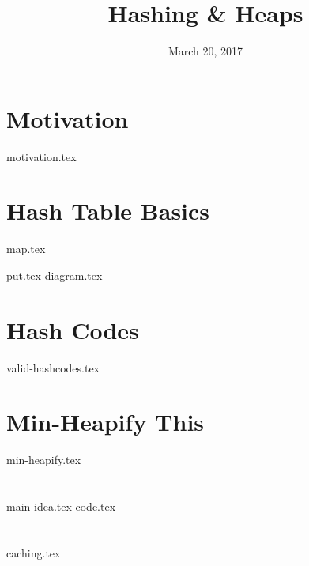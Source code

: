 \documentclass{exam}
\title{Hashing \& Heaps}
\date{March 20, 2017}
\begin{document}
\maketitle

\section{Motivation}
\begin{questions}
{motivation.tex}
\end{questions}

\clearpage

\section{Hash Table Basics}
{map.tex}
\begin{questions}
{put.tex}
{diagram.tex}
\end{questions}

\clearpage

\section{Hash Codes}
\begin{questions}
{valid-hashcodes.tex}
\end{questions}

\clearpage

\section{Min-Heapify This}
\begin{questions}
{min-heapify.tex}
\end{questions}

\clearpage

\section{}
\begin{questions}
{main-idea.tex}
{code.tex}
\end{questions}

\clearpage

\section{}
\begin{questions}
{caching.tex}
\end{questions}
\end{document}
